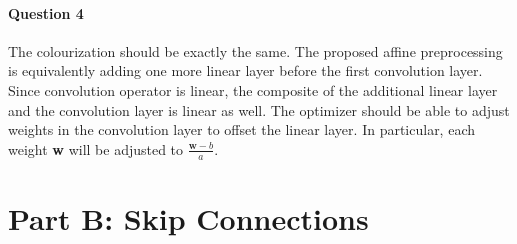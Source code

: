 \documentclass[12pt]{article}
\begin{document}
	\paragraph{Question 4} The colourization should be exactly the same. The proposed affine preprocessing is equivalently adding one more linear layer before the first convolution layer. Since convolution operator is linear, the composite of the additional linear layer and the convolution layer is linear as well. The optimizer should be able to adjust weights in the convolution layer to offset the linear layer. In particular, each weight \textbf{w} will be adjusted to $\frac{\textbf{w} - b}{a}$.
	
	\section{Part B: Skip Connections}
\end{document}
